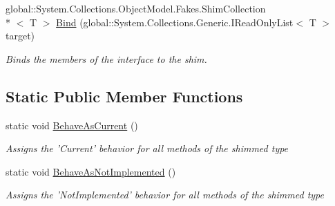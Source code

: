 \begin{DoxyCompactItemize}
global\-::\-System.\-Collections.\-Object\-Model.\-Fakes.\-Shim\-Collection\\*
$<$ T $>$ \hyperlink{class_system_1_1_collections_1_1_object_model_1_1_fakes_1_1_shim_collection_3_01_t_01_4_a7f25e71603648951b0bb3ea5e4f052b0}{Bind} (global\-::\-System.\-Collections.\-Generic.\-I\-Read\-Only\-List$<$ T $>$ target)
\begin{DoxyCompactList}\small\item\em Binds the members of the interface to the shim.\end{DoxyCompactList}\end{DoxyCompactItemize}
\subsection*{Static Public Member Functions}
\begin{DoxyCompactItemize}
\item 
static void \hyperlink{class_system_1_1_collections_1_1_object_model_1_1_fakes_1_1_shim_collection_3_01_t_01_4_af614856f81c9e2986645d311a9cf18ea}{Behave\-As\-Current} ()
\begin{DoxyCompactList}\small\item\em Assigns the 'Current' behavior for all methods of the shimmed type\end{DoxyCompactList}\item 
static void \hyperlink{class_system_1_1_collections_1_1_object_model_1_1_fakes_1_1_shim_collection_3_01_t_01_4_aac349ca4a0c747b8d2077dd537306ffc}{Behave\-As\-Not\-Implemented} ()
\begin{DoxyCompactList}\small\item\em Assigns the 'Not\-Implemented' behavior for all methods of the shimmed type\end{DoxyCompactList}\end{DoxyCompactItemize}
